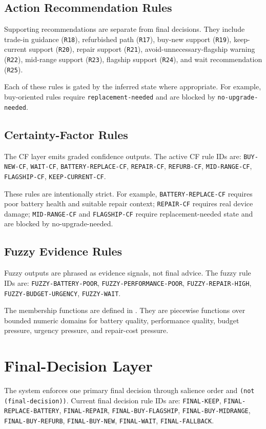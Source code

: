 \documentclass[11pt]{article}
\newcommand{\filepath}[1]{\path{#1}}
\begin{document}
\subsection{Action Recommendation Rules}
Supporting recommendations are separate from final decisions. They include trade-in guidance (\texttt{R18}), refurbished path (\texttt{R17}), buy-new support (\texttt{R19}), keep-current support (\texttt{R20}), repair support (\texttt{R21}), avoid-unnecessary-flagship warning (\texttt{R22}), mid-range support (\texttt{R23}), flagship support (\texttt{R24}), and wait recommendation (\texttt{R25}).

Each of these rules is gated by the inferred state where appropriate. For example, buy-oriented rules require \texttt{replacement-needed} and are blocked by \texttt{no-upgrade-needed}.

\subsection{Certainty-Factor Rules}
The CF layer emits graded confidence outputs. The active CF rule IDs are:
\texttt{BUY-NEW-CF}, \texttt{WAIT-CF}, \texttt{BATTERY-REPLACE-CF}, \texttt{REPAIR-CF}, \texttt{REFURB-CF}, \texttt{MID-RANGE-CF}, \texttt{FLAGSHIP-CF}, \texttt{KEEP-CURRENT-CF}.

These rules are intentionally strict. For example, \texttt{BATTERY-REPLACE-CF} requires poor battery health and suitable repair context; \texttt{REPAIR-CF} requires real device damage; \texttt{MID-RANGE-CF} and \texttt{FLAGSHIP-CF} require replacement-needed state and are blocked by no-upgrade-needed.

\subsection{Fuzzy Evidence Rules}
Fuzzy outputs are phrased as evidence signals, not final advice. The fuzzy rule IDs are:
\texttt{FUZZY-BATTERY-POOR}, \texttt{FUZZY-PERFORMANCE-POOR}, \texttt{FUZZY-REPAIR-HIGH}, \texttt{FUZZY-BUDGET-URGENCY}, \texttt{FUZZY-WAIT}.

The membership functions are defined in \filepath{fuzzy.clp}. They are piecewise functions over bounded numeric domains for battery quality, performance quality, budget pressure, urgency pressure, and repair-cost pressure.

\section{Final-Decision Layer}
The system enforces one primary final decision through salience order and \texttt{(not (final-decision))}. Current final decision rule IDs are:
\texttt{FINAL-KEEP}, \texttt{FINAL-REPLACE-BATTERY}, \texttt{FINAL-REPAIR}, \texttt{FINAL-BUY-FLAGSHIP}, \texttt{FINAL-BUY-MIDRANGE}, \texttt{FINAL-BUY-REFURB}, \texttt{FINAL-BUY-NEW}, \texttt{FINAL-WAIT}, \texttt{FINAL-FALLBACK}.
\end{document}

